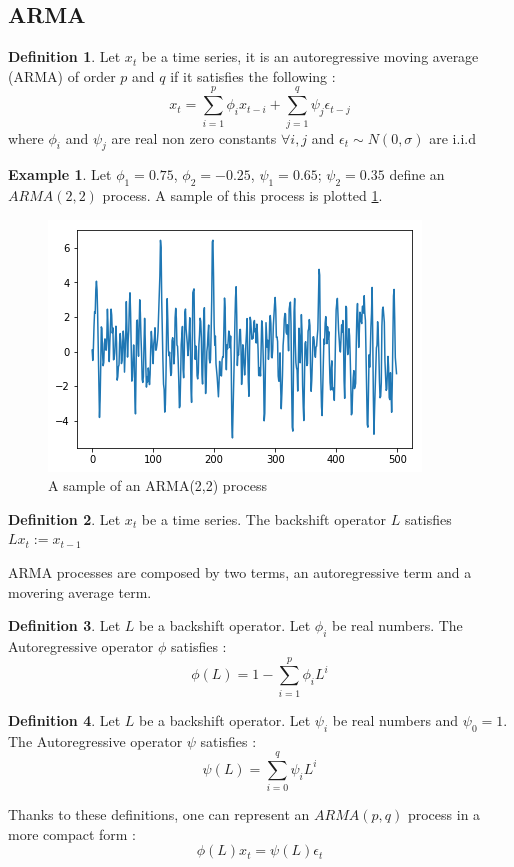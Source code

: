 \documentclass{article}
\theoremstyle{definition}
\newtheorem{ex}{Example}[section]
\newtheorem{Def}{Definition}[section]
\begin{document}
\subsection{ARMA}
\begin{Def}\label{ARMA}
Let $x_t$ be a time series, it is an autoregressive moving average (ARMA) of order $p$ and $q$ if it satisfies the following : 
\begin{equation*}\label{ARMA(p,q)}
x_{t}=\sum_{i=1}^{p}\phi_ix_{t-i}+\sum_{j=1}^{q}\psi_j\epsilon_{t-j} 
\end{equation*}
where $\phi_i$ and $\psi_j$ are real non zero constants $\forall i,j$ and $\epsilon_t\sim N(0,\sigma)$ are i.i.d
\end{Def}
\begin{ex} Let $\phi_1=0.75$, $\phi_2=-0.25$, $\psi_1=0.65$; $\psi_2=0.35$ define an $ARMA(2,2)$ process. A sample of this process is plotted \ref{fig:ARMA(2,2)_sample}. 
\begin{figure}
    \includegraphics[width=\textwidth]{ARMA(2,2).png}
    \caption{A sample of an ARMA(2,2) process}
    \label{fig:ARMA(2,2)_sample}
\end{figure}
\end{ex}
\begin{Def}\label{backshift}
Let $x_t$ be a time series. The backshift operator $L$ satisfies $Lx_t:=x_{t-1}$
\end{Def}
ARMA processes are composed by two terms, an autoregressive term and a movering average term. 
\begin{Def}Let $L$ be a backshift operator. Let $\phi_i$ be real numbers. The Autoregressive operator $\phi$ satisfies : 
\begin{equation*}
    \phi(L)=1-\sum_{i=1}^{p}\phi_i L^{i}
\end{equation*}
\end{Def}
\begin{Def}
Let $L$ be a backshift operator. Let $\psi_i$ be real numbers and $\psi_0=1$. The Autoregressive operator $\psi$ satisfies : 
\begin{equation*}
    \psi(L)=\sum_{i=0}^{q}\psi_i L^{i}
\end{equation*}
\end{Def}
Thanks to these definitions, one can represent an $ARMA(p,q)$ process in a more compact form : 
\begin{equation*}
    \phi(L)x_t=\psi(L)\epsilon_t
\end{equation*}
\end{document}
